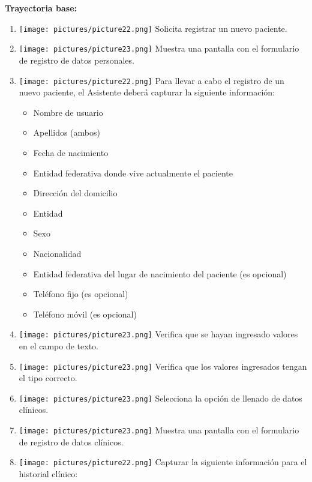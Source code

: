 \textbf{Trayectoria base:}        
\begin{enumerate}
\item \texttt{[image: pictures/picture22.png]} Solicita registrar un nuevo paciente.
\item \texttt{[image: pictures/picture23.png]} Muestra una pantalla con el formulario de registro de datos personales.
\item \texttt{[image: pictures/picture22.png]} Para llevar a cabo el registro de un nuevo paciente, el Asistente deberá capturar la siguiente información:
      \begin{itemize}[nosep]
      \item Nombre de usuario
      \item Apellidos (ambos)
      \item Fecha de nacimiento
      \item Entidad federativa donde vive actualmente el paciente
      \item Dirección del domicilio
      \item Entidad 
      \item Sexo
      \item Nacionalidad
      \item Entidad federativa del lugar de nacimiento del paciente (es opcional)
      \item Teléfono fijo (es opcional)
      \item Teléfono móvil (es opcional)
      \end{itemize}
      
\item \texttt{[image: pictures/picture23.png]} Verifica que se hayan ingresado valores en el campo de texto.
\item \texttt{[image: pictures/picture23.png]} Verifica que los valores ingresados tengan el tipo correcto.
\item \texttt{[image: pictures/picture23.png]} Selecciona la opción de llenado de datos clínicos.
\item \texttt{[image: pictures/picture23.png]} Muestra una pantalla con el formulario de registro de datos clínicos.
\item \texttt{[image: pictures/picture22.png]} Capturar la siguiente información para el historial clínico:
      

\end{enumerate}
